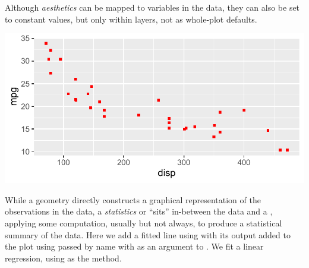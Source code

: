 \documentclass[krantz2]{krantz}\usepackage{knitr}
\begin{document}
Although \emph{aesthetics} can be mapped to variables in the data, they can also be set to constant values, but only within layers, not as whole-plot defaults.

\begin{knitrout}\footnotesize
{}\color{fgcolor}\begin{kframe}
\begin{alltt}
\hlstd{(} 
       \hlstd{(}    \hlopt{+}
  \hlstd{(} \hlstd{=} \hlstd{,}  \hlstd{=} \hlstd{)}
\end{alltt}
\end{kframe}

{\centering \includegraphics[width=.7\textwidth]{figure/pos-ggplot-basics-04a-1} 

}



\end{knitrout}

While a geometry directly constructs a graphical representation of the observations in the data, a \emph{statistics} or  ``sits'' in-between the data and a , applying some computation, usually but not always, to produce a statistical summary of the data. Here we add a fitted line using  with its output added to the plot using  passed by name with  as an argument to . We fit a linear regression, using  as the method.
\end{document}
